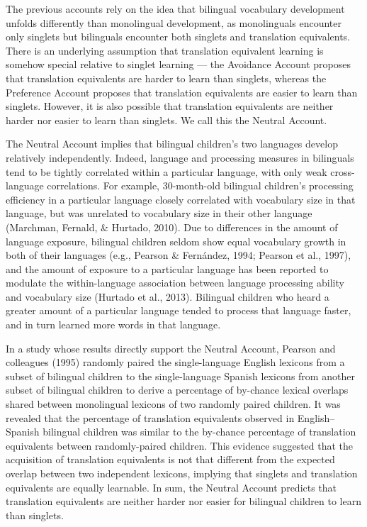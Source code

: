 \documentclass[
  english,
  ,man,floatsintext]{apa6}
\begin{document}
The previous accounts rely on the idea that bilingual vocabulary development unfolds differently than monolingual development, as monolinguals encounter only singlets but bilinguals encounter both singlets and translation equivalents. There is an underlying assumption that translation equivalent learning is somehow special relative to singlet learning --- the Avoidance Account proposes that translation equivalents are harder to learn than singlets, whereas the Preference Account proposes that translation equivalents are easier to learn than singlets. However, it is also possible that translation equivalents are neither harder nor easier to learn than singlets. We call this the Neutral Account.

The Neutral Account implies that bilingual children's two languages develop relatively independently. Indeed, language and processing measures in bilinguals tend to be tightly correlated within a particular language, with only weak cross-language correlations. For example, 30-month-old bilingual children's processing efficiency in a particular language closely correlated with vocabulary size in that language, but was unrelated to vocabulary size in their other language (Marchman, Fernald, \& Hurtado, 2010). Due to differences in the amount of language exposure, bilingual children seldom show equal vocabulary growth in both of their languages (e.g., Pearson \& Fernández, 1994; Pearson et al., 1997), and the amount of exposure to a particular language has been reported to modulate the within-language association between language processing ability and vocabulary size (Hurtado et al., 2013). Bilingual children who heard a greater amount of a particular language tended to process that language faster, and in turn learned more words in that language.

In a study whose results directly support the Neutral Account, Pearson and colleagues (1995) randomly paired the single-language English lexicons from a subset of bilingual children to the single-language Spanish lexicons from another subset of bilingual children to derive a percentage of by-chance lexical overlaps shared between monolingual lexicons of two randomly paired children. It was revealed that the percentage of translation equivalents observed in English--Spanish bilingual children was similar to the by-chance percentage of translation equivalents between randomly-paired children. This evidence suggested that the acquisition of translation equivalents is not that different from the expected overlap between two independent lexicons, implying that singlets and translation equivalents are equally learnable. In sum, the Neutral Account predicts that translation equivalents are neither harder nor easier for bilingual children to learn than singlets.
\end{document}
